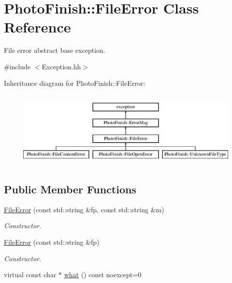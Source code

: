 \hypertarget{class_photo_finish_1_1_file_error}{}\section{Photo\+Finish\+:\+:File\+Error Class Reference}
\label{class_photo_finish_1_1_file_error}


File error abstract base exception.  




{\ttfamily \#include $<$Exception.\+hh$>$}

Inheritance diagram for Photo\+Finish\+:\+:File\+Error\+:\begin{figure}[H]
\begin{center}
\leavevmode
\includegraphics[height=3.888889cm]{class_photo_finish_1_1_file_error}
\end{center}
\end{figure}
\subsection*{Public Member Functions}
\begin{DoxyCompactItemize}
\item 
\hyperlink{class_photo_finish_1_1_file_error_a5c657587ebc9d3656318b6443359f3fd}{File\+Error} (const std\+::string \&fp, const std\+::string \&m)
\begin{DoxyCompactList}\small\item\em Constructor. \end{DoxyCompactList}\item 
\hyperlink{class_photo_finish_1_1_file_error_a4646f633f8b6383a52147cedacf3cf1d}{File\+Error} (const std\+::string \&fp)
\begin{DoxyCompactList}\small\item\em Constructor. \end{DoxyCompactList}\item 
virtual const char $\ast$ \hyperlink{class_photo_finish_1_1_file_error_ac4da80387c770aa95858dae8aac9a81e}{what} () const noexcept=0
\end{DoxyCompactItemize}
